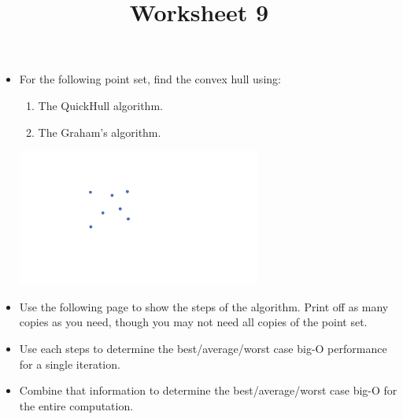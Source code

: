 \documentclass[a4paper,12pt]{article}
\title{Worksheet 9}
\begin{document}
\maketitle

\worksheetGroundRules

\worksheetSubmission

\assignmentInstructions

\begin{itemize}


\item For the following point set, find the convex hull using:

\begin{enumerate}
	\item The QuickHull algorithm. 
	\item The Graham's algorithm. 
\end{enumerate}

\vspace{-10pt}
\begin{center}
\includegraphics[width=8cm]{../images/chull.pdf}
\end{center}

\vspace{-10pt}
\item Use the following page to show the steps of the algorithm. Print off as many copies as you need, though you may not need all copies of the point set. 

\item Use each steps to determine the best/average/worst case big-O performance for a single iteration. 
\item Combine that information to determine the best/average/worst case big-O for the entire computation.



\end{itemize}





\newpage
\end{document}
